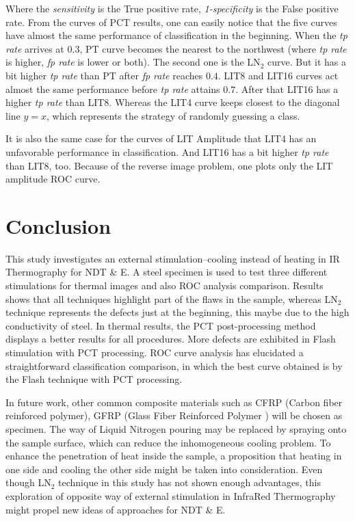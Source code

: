 \documentclass[]{spie}  %
\begin{document}
Where the \textit{sensitivity} is the True positive rate, \textit{1-specificity} is the False positive rate.
From the curves of PCT results, one can easily notice that the five curves have almost the same performance of classification in the beginning. When the \textit{tp rate} arrives at $0.3$, PT curve becomes the nearest to the northwest (where \textit{tp rate} is higher, \textit{fp rate} is lower or both). The second one is the LN$_2$ curve. But it has a bit higher \textit{tp rate} than PT after \textit{fp rate} reaches $0.4$. LIT8 and LIT16 curves act almost the same performance before \textit{tp rate} attains $0.7$. After that LIT16 has a higher \textit{tp rate} than LIT8. Whereas the LIT4 curve keeps closest to the diagonal line $y=x$, which represents the strategy of randomly guessing a class.

It is also the same case for the curves of LIT Amplitude that LIT4 has an unfavorable performance in classification. And LIT16 has a bit higher \textit{tp rate} than LIT8, too. Because of the reverse image problem, one plots only the LIT amplitude ROC curve.



\section{Conclusion} %
\label{sec:conclusion}
This study investigates an external stimulation--cooling instead of heating in IR Thermography for NDT \& E. 
A steel specimen is used to test three different stimulations for thermal images and also ROC analysis comparison. 
Results shows that all techniques highlight part of the flaws in the sample, whereas LN$_2$ technique represents the defects just at the beginning, this maybe due to the high conductivity of steel. 
In thermal results, the PCT post-processing method displays a better results for all procedures. More defects are exhibited in Flash stimulation with PCT processing.
ROC curve analysis has elucidated a straightforward classification comparison, in which the best curve obtained is by the Flash technique with PCT processing.

In future work, other common composite materials such as CFRP (Carbon fiber reinforced polymer), GFRP (Glass Fiber Reinforced Polymer ) will be chosen as specimen. The way of Liquid Nitrogen pouring may be replaced by spraying onto the sample surface, which can reduce the inhomogeneous cooling problem. To enhance the penetration of heat inside the sample, a proposition that heating in one side and cooling the other side might be taken into consideration.
Even though LN$_2$ technique in this study has not shown enough advantages, this exploration of opposite way of external stimulation in InfraRed Thermography might propel new ideas of approaches for NDT \& E.
\end{document}
